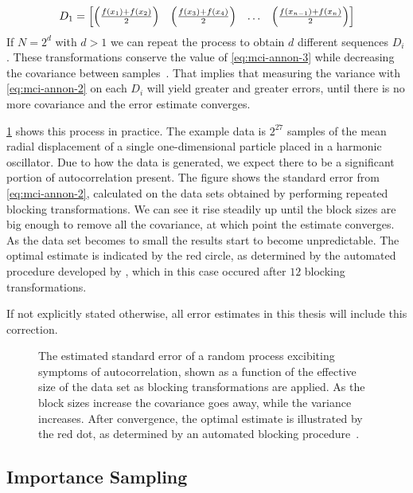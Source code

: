 \documentclass[Thesis.tex]{subfiles}
\begin{document}
\begin{align}
  D_1 = \mqty[\qty(\frac{f(x_1) + f(x_2)}{2}) & \qty(\frac{f(x_3) + f(x_4)}{2}) & \dots & \qty(\frac{f(x_{n-1}) + f(x_n)}{2})]
\end{align}
If $N = 2^d$ with $d > 1$ we can repeat the process to obtain $d$ different
sequences $D_i$. These transformations conserve the value of \cref{eq:mci-annon-3}
while decreasing the covariance between samples~\cite{Jonsson-2018}. That implies that measuring
the variance with \cref{eq:mci-annon-2} on each $D_i$ will yield greater and
greater errors, until there is no more covariance and the error estimate
converges. 

\cref{fig:blocking-example-diagram} shows this process in practice. The example
data is $2^{27}$ samples of the mean radial displacement of a single
one-dimensional particle placed in a harmonic oscillator. Due to how the data is
generated, we expect there to be a significant portion of autocorrelation
present. The figure shows the standard error from \cref{eq:mci-annon-2},
calculated on the data sets obtained by performing repeated blocking
transformations. We can see it rise steadily up until the block sizes are big
enough to remove all the covariance, at which point the estimate converges. As
the data set becomes to small the results start to become unpredictable. The
optimal estimate is indicated by the red circle, as determined by the automated
procedure developed by \textcite{Jonsson-2018}, which in this case occured after
$\num{12}$ blocking transformations.

If not explicitly stated otherwise, all error estimates in this thesis will
include this correction.


\begin{figure}[h]
  \centering
  \resizebox{0.7\linewidth}{!}{%
    
  }
  \caption{The estimated standard error of a random process excibiting symptoms
    of autocorrelation, shown as a function of the effective size of the data set as
    blocking transformations are applied. As the block sizes increase the 
    covariance goes away, while the variance increases. After convergence, the
    optimal estimate is illustrated by the red dot, as determined by an automated blocking
    procedure~\cite{Jonsson-2018}.}
  \label{fig:blocking-example-diagram}
\end{figure}



\subsection{Importance Sampling}
\end{document}
